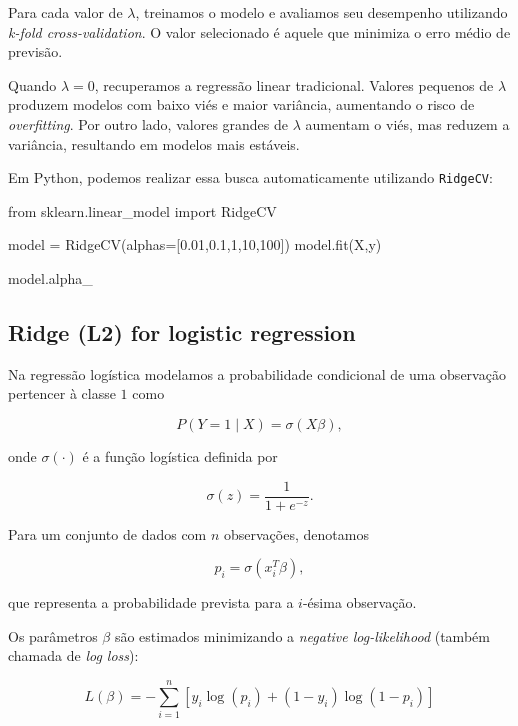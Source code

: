 \documentclass{article}
\begin{document}
Para cada valor de $\lambda$, treinamos o modelo e avaliamos seu
desempenho utilizando \textit{k-fold cross-validation}. O valor
selecionado é aquele que minimiza o erro médio de previsão.

Quando $\lambda = 0$, recuperamos a regressão linear tradicional.
Valores pequenos de $\lambda$ produzem modelos com baixo viés e maior
variância, aumentando o risco de \textit{overfitting}. Por outro lado,
valores grandes de $\lambda$ aumentam o viés, mas reduzem a variância,
resultando em modelos mais estáveis.

Em Python, podemos realizar essa busca automaticamente utilizando
\texttt{RidgeCV}:

\begin{pythoncode}
from sklearn.linear_model import RidgeCV

model = RidgeCV(alphas=[0.01,0.1,1,10,100])
model.fit(X,y)

model.alpha_
\end{pythoncode}

\subsection{Ridge (L2) for logistic regression}

Na regressão logística modelamos a probabilidade condicional de uma 
observação pertencer à classe $1$ como

\begin{equation*}
    P(Y = 1 \mid X) = \sigma(X\beta),
\end{equation*}

onde $\sigma(\cdot)$ é a função logística definida por

\begin{equation*}
    \sigma(z) = \frac{1}{1 + e^{-z}}.
\end{equation*}

Para um conjunto de dados com $n$ observações, denotamos

\begin{equation*}
    p_i = \sigma(x_i^{T}\beta),
\end{equation*}

que representa a probabilidade prevista para a $i$-ésima observação.

Os parâmetros $\beta$ são estimados minimizando a \textit{negative log-likelihood}
(também chamada de \textit{log loss}):

\begin{equation*}
    L(\beta) = -\sum_{i = 1}^{n}\left[y_i \log(p_i) + (1 - y_i)\log(1 - p_i)\right]
\end{equation*}
\end{document}
